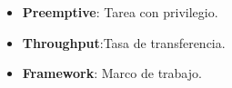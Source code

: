 \begin{itemize}
\item \textbf{Preemptive}: Tarea con privilegio.
\item \textbf{Throughput}:Tasa de transferencia.
\item \textbf{Framework}: Marco de trabajo.
\end{itemize}  